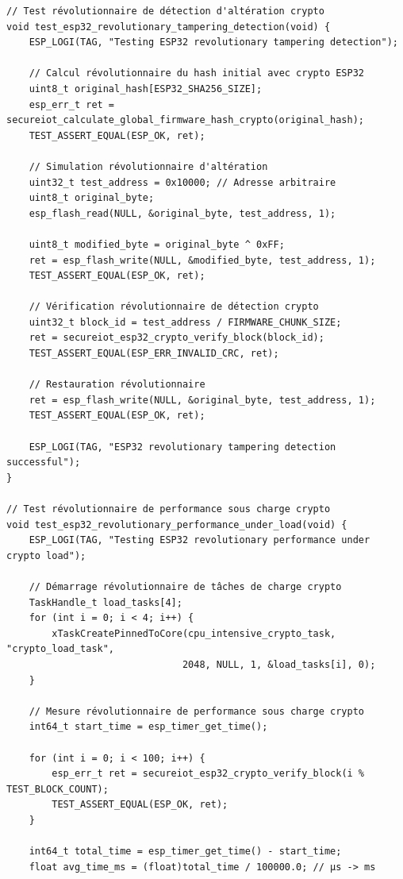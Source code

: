 \begin{lstlisting}[caption={Framework révolutionnaire de test embarqué ESP32 crypto}]
// Test révolutionnaire de détection d'altération crypto
void test_esp32_revolutionary_tampering_detection(void) {
    ESP_LOGI(TAG, "Testing ESP32 revolutionary tampering detection");
    
    // Calcul révolutionnaire du hash initial avec crypto ESP32
    uint8_t original_hash[ESP32_SHA256_SIZE];
    esp_err_t ret = secureiot_calculate_global_firmware_hash_crypto(original_hash);
    TEST_ASSERT_EQUAL(ESP_OK, ret);
    
    // Simulation révolutionnaire d'altération
    uint32_t test_address = 0x10000; // Adresse arbitraire
    uint8_t original_byte;
    esp_flash_read(NULL, &original_byte, test_address, 1);
    
    uint8_t modified_byte = original_byte ^ 0xFF;
    ret = esp_flash_write(NULL, &modified_byte, test_address, 1);
    TEST_ASSERT_EQUAL(ESP_OK, ret);
    
    // Vérification révolutionnaire de détection crypto
    uint32_t block_id = test_address / FIRMWARE_CHUNK_SIZE;
    ret = secureiot_esp32_crypto_verify_block(block_id);
    TEST_ASSERT_EQUAL(ESP_ERR_INVALID_CRC, ret);
    
    // Restauration révolutionnaire
    ret = esp_flash_write(NULL, &original_byte, test_address, 1);
    TEST_ASSERT_EQUAL(ESP_OK, ret);
    
    ESP_LOGI(TAG, "ESP32 revolutionary tampering detection successful");
}

// Test révolutionnaire de performance sous charge crypto
void test_esp32_revolutionary_performance_under_load(void) {
    ESP_LOGI(TAG, "Testing ESP32 revolutionary performance under crypto load");
    
    // Démarrage révolutionnaire de tâches de charge crypto
    TaskHandle_t load_tasks[4];
    for (int i = 0; i < 4; i++) {
        xTaskCreatePinnedToCore(cpu_intensive_crypto_task, "crypto_load_task", 
                               2048, NULL, 1, &load_tasks[i], 0);
    }
    
    // Mesure révolutionnaire de performance sous charge crypto
    int64_t start_time = esp_timer_get_time();
    
    for (int i = 0; i < 100; i++) {
        esp_err_t ret = secureiot_esp32_crypto_verify_block(i % TEST_BLOCK_COUNT);
        TEST_ASSERT_EQUAL(ESP_OK, ret);
    }
    
    int64_t total_time = esp_timer_get_time() - start_time;
    float avg_time_ms = (float)total_time / 100000.0; // µs -> ms
    

\end{lstlisting}
